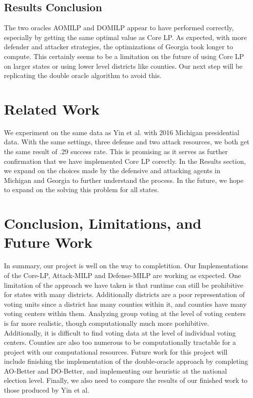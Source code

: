 \documentclass[letterpaper]{article} %
\begin{document}
\subsection{Results Conclusion}

The two oracles AOMILP and DOMILP appear to have performed correctly, especially by getting the same optimal value as Core LP. As expected, with more defender and attacker strategies, the optimizations of Georgia took longer to compute. This certainly seems to be a limitation on the future of using Core LP on larger states or using lower level districts like counties. Our next step will be replicating the double oracle algorithm to avoid this. 


\section{Related Work}

We experiment on the same data as Yin et al. with 2016 Michigan presidential data. With the same settings, three defense and two attack resources, we both get the same result of .29 success rate. This is promising as it serves as further confirmation that we have implemented Core LP corectly. In the Results section, we expand on the choices made by the defensive and attacking agents in Michigan and Georgia to further understand the process. In the future, we hope to expand on the solving this problem for all states. 

\section{Conclusion, Limitations, and Future Work}
In summary, our project is well on the way to completition. Our Implementations of the Core-LP, Attack-MILP and Defense-MILP are working as expected. One limitation of the approach we have taken is that runtime can still be prohibitive for states with many districts. Additionally districts are a poor representation of voting units since a district has many counties within it, and counties have many voting centers within them. Analyzing group voting at the level of voting centers is far more realistic, though computationally much more porhibitive. Additionally, it is difficult to find voting data at the level of individual voting centers. Counties are also too numerous to be computationally tractable for a project with our computational resources. Future work for this project will include finishing the implementation of the double-oracle approach by completing AO-Better and DO-Better, and implementing our heuristic at the national election level. Finally, we also need to compare the results of our finished work to those produced by Yin et al.

{


}
\end{document}
